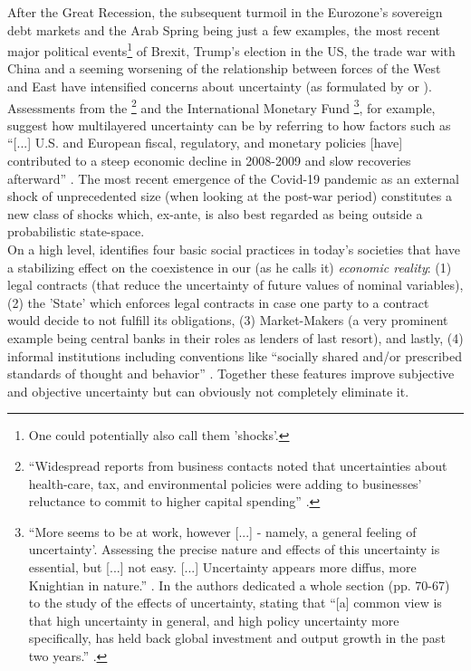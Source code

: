 \documentclass[a4paper,11pt,listof=nochaptergap,oneside,pointednumbers,bibtotoc,bigheadings,liststotoc,hidelinks]{scrbook}
\theoremstyle{mysatz}
\theoremstyle{mydefinition}
\theoremstyle{mytheorem}
\theoremstyle{mybemerkung}
\begin{document}
After the Great Recession, the subsequent turmoil in the Eurozone's sovereign debt markets and the Arab Spring being just a few examples, the most recent major political events\footnote{One could potentially also call them 'shocks'.} of Brexit, Trump's election in the US,  the trade war with China and a seeming worsening of the relationship between forces of the West and East have intensified concerns about uncertainty (as formulated by \citep{bakeretal:15} or \citealp{bakerbloomdavis:19}). Assessments from the 
\citet{FOMC:09}\footnote{``Widespread reports from business contacts noted that uncertainties about health-care, tax, and environmental policies were adding to businesses' reluctance to commit to higher capital spending'' \citep{FOMC:09}.} and the International Monetary Fund \citep{IMF:12, IMF:13}\footnote{``More seems to be at work, however [...] - namely, a general feeling of uncertainty'. Assessing the precise nature and effects of this uncertainty is essential, but [...] not easy. [...] Uncertainty appears more diffus, more Knightian in nature.'' \citep{IMF:12}. In \citet{IMF:13} the authors dedicated a whole section (pp. 70-67) to the study of the effects of uncertainty, stating that ``[a] common view is that high uncertainty in general, and high policy uncertainty more specifically, has held back global investment and output growth in the past two years.'' \citep[p. 70]{IMF:13}.}, for example, suggest how multilayered uncertainty can be by referring to how factors such as ``[...] U.S. and European fiscal, regulatory, and monetary policies [have] contributed to a steep economic decline in 2008-2009 and slow recoveries afterward'' \citep[p.1594]{bakeretal:15}. The most recent emergence of the Covid-19 pandemic as an external shock of unprecedented size (when looking at the post-war period) constitutes a new class of shocks which, ex-ante, is also best regarded as being outside a probabilistic state-space. \\

On a high level, \citet{dequesh:00} identifies four basic social practices in today's societies that have a stabilizing effect on the coexistence in our (as  he calls it) \textit{economic reality}: (1) legal contracts (that reduce the uncertainty of future values of nominal variables), (2) the 'State' which enforces legal contracts in case one party to a contract would decide to not fulfill its obligations, (3) Market-Makers (a very prominent example being central banks in their roles as lenders of last resort), and lastly, (4) informal institutions including conventions like ``socially shared and/or prescribed standards of thought and behavior'' \citep[p. 54]{dequesh:00}.  Together these features improve subjective and objective uncertainty but can obviously not completely eliminate it.
\end{document}
